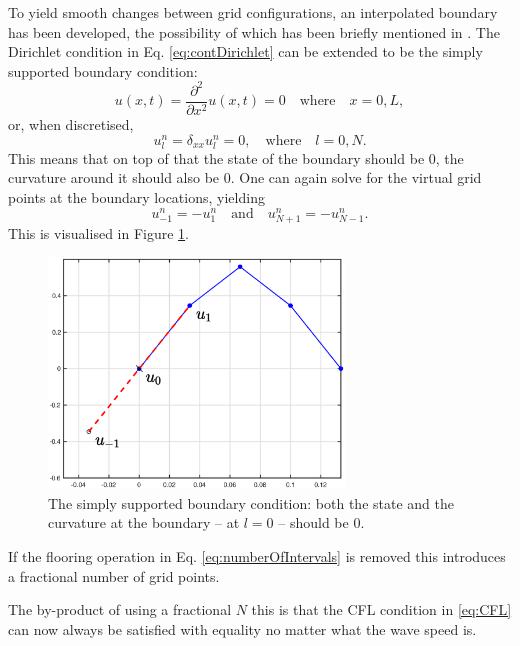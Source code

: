To yield smooth changes between grid configurations, an interpolated boundary has been developed, the possibility of which has been briefly mentioned in \cite[p. 145]{theBible}. The Dirichlet condition in Eq. \eqref{eq:contDirichlet} can be extended to be the simply supported boundary condition:
\begin{equation}
    u(x, t) = \frac{\partial^2}{\partial x^2}u(x, t) = 0 \quad \text{where} \quad x = 0, L,
\end{equation}
or, when discretised,
\begin{equation}\label{eq:simplySupportedDiscrete}
    u_l^n = \delta_{xx}u_l^n = 0, \quad \text{where} \quad l = 0, N.
\end{equation}
This means that on top of that the state of the boundary should be $0$, the curvature around it should also be $0$. One can again solve for the virtual grid points at the boundary locations, yielding
\begin{equation}
    u_{-1}^n = -u_1^n \quad \text{and} \quad u_{N+1}^n = -u_{N-1}^n.
\end{equation}
This is visualised in Figure \ref{fig:simplySupportedBound}.

\begin{figure}
    \centering
    \includegraphics[width=0.7\textwidth]{dynamic/simplySupportedBoundary.eps}
    \caption{\label{fig:simplySupportedBound}{The simply supported boundary condition: both the state and the curvature at the boundary -- at $l=0$ -- should be $0$.}}
\end{figure} 

If the flooring operation in Eq. \eqref{eq:numberOfIntervals} is removed this introduces a fractional number of grid points.


The by-product of using a fractional $N$ this is that the CFL condition in \eqref{eq:CFL} can now always be satisfied with equality no matter what the wave speed is.

